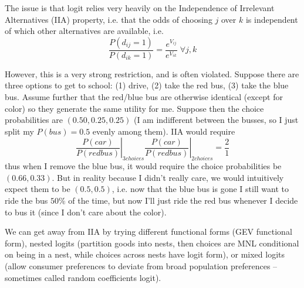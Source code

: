 The issue is that logit relies very heavily on the Independence of
Irrelevant Alternatives (IIA) property, i.e. that the odds of choosing
$j$ over $k$ is independent of which other alternatives are available,
i.e.
\[
\frac{P(d_{ij} = 1)}{P(d_{ik}=1)} = \frac{e^{V_{ij}}}{e^{V_{ik}}} \; \forall j,k
\]

However, this is a very strong restriction, and is often
violated. Suppose there are three options to get to school: (1) drive,
(2) take the red bus, (3) take the blue bus. Assume further that the
red/blue bus are otherwise identical (except for color) so they
generate the same utility for me. Suppose then the choice
probabilities are $(0.50, 0.25, 0.25)$ (I am indifferent between the
busses, so I just split my $P(bus) = 0.5$ evenly among them). IIA
would require
\[
\left. \frac{P(car)}{P(red bus)} \right|_{3 choices}
\left. \frac{P(car)}{P(red bus)} \right|_{2 choices}
= \frac{2}{1}
\]
thus when I remove the blue bus, it would require the choice
probabilities be $(0.66, 0.33)$. But in reality because I didn't
really care, we would intuitively expect them to be $(0.5, 0.5)$,
i.e. now that the blue bus is gone I still want to ride the bus $50\%$
of the time, but now I'll just ride the red bus whenever I decide to
bus it (since I don't care about the color).

We can get away from IIA by trying different functional forms (GEV
functional form), nested logits (partition goods into nests, then
choices are MNL conditional on being in a nest, while choices across
nests have logit form), or mixed logits (allow consumer preferences to
deviate from broad population preferences -- sometimes called random
coefficients logit).
